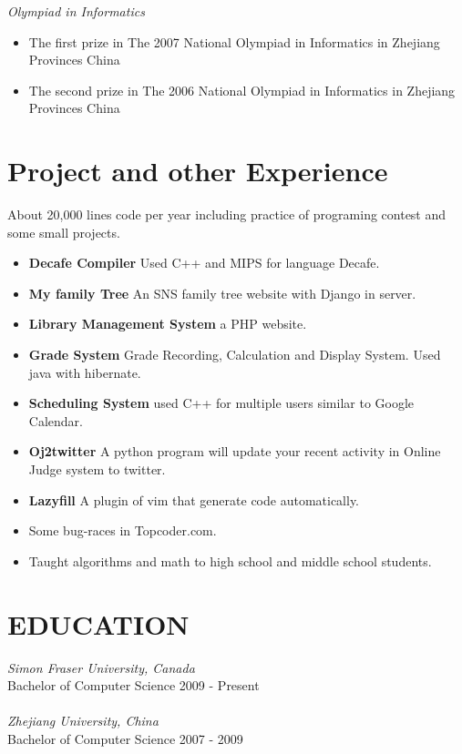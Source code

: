 \documentclass[line,margin]{res}
\begin{document}
\begin{resume}
\begin{itemize}
\end{itemize}
{\sl Olympiad in Informatics}
\begin{itemize}
\item The first  prize in The 2007 National Olympiad in Informatics in Zhejiang Provinces China 
\item The second prize in The 2006 National Olympiad in Informatics in Zhejiang Provinces China
\end{itemize}


\section{Project and other Experience}
About 20,000 lines code per year including practice of programing contest and
some small projects.
\begin{itemize}
\item {\bf Decafe Compiler} Used C++ and MIPS for language Decafe. 
\item {\bf My family Tree} An SNS family tree website with Django in server.
\item {\bf Library Management System} a PHP website.
\item {\bf Grade System} Grade Recording, Calculation and Display System. Used java with hibernate.
\item {\bf Scheduling System} used C++ for multiple users similar to Google Calendar.
\item {\bf Oj2twitter} A python program will update your recent activity in Online Judge system to twitter.
\item {\bf Lazyfill} A plugin of vim that generate code automatically.
\item Some bug-races in Topcoder.com.
\item Taught algorithms and math to high school and middle school students.
\end{itemize}
\section{EDUCATION}
				{\sl Simon Fraser University, Canada}\\
				Bachelor of Computer Science 
				2009 - Present \\
				\\
				{\sl Zhejiang University, China} \\
				Bachelor of Computer Science	
				2007 - 2009  

\end{resume}
\end{document}
